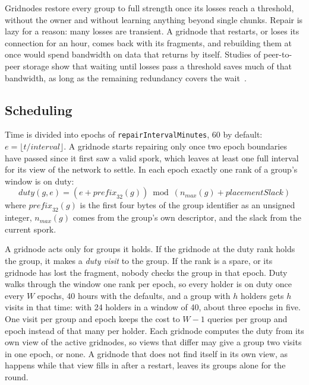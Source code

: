 \documentclass[10pt,a4paper,final]{article}
\newcommand{\code}[1]{\texttt{#1}}
\begin{document}
Gridnodes restore every group to full strength once its losses reach a threshold, without the owner and without
learning anything beyond single chunks. Repair is lazy for a reason: many losses are transient. A gridnode that
restarts, or loses its connection for an hour, comes back with its fragments, and rebuilding them at once would spend
bandwidth on data that returns by itself. Studies of peer-to-peer storage show that waiting until losses pass a
threshold saves much of that bandwidth, as long as the remaining redundancy covers the
wait~\cite{bhagwan2004,chun2006,giroire2010}.

\subsection{Scheduling}

Time is divided into epochs of \code{repairIntervalMinutes}, 60 by default: $e = \lfloor t / \mathit{interval}
\rfloor$. A gridnode starts repairing only once two epoch boundaries have passed since it first saw a valid spork,
which leaves at least one full interval for its view of the network to settle. In each epoch exactly one rank of a
group's window is on duty:
\begin{equation}
	\mathit{duty}(g, e) = \left(e + \mathit{prefix}_{32}(g)\right) \bmod \left(n_{max}(g) +
	\mathit{placementSlack}\right)
\end{equation}
where $\mathit{prefix}_{32}(g)$ is the first four bytes of the group identifier as an unsigned integer,
$n_{max}(g)$ comes from the group's own descriptor, and the slack from the current spork.

A gridnode acts only for groups it holds. If the gridnode at the duty rank holds the group, it makes a \emph{duty
visit} to the group. If the rank is a spare, or its gridnode has lost the fragment, nobody checks the group in that
epoch. Duty walks through the window one rank per epoch, so every holder is on duty once every $W$ epochs, 40 hours
with the defaults, and a group with $h$ holders gets $h$ visits in that time: with 24 holders in a window of 40,
about three epochs in five. One visit per group and epoch keeps the cost to $W - 1$ queries per group and epoch
instead of that many per holder. Each gridnode computes the duty from its own view of the active gridnodes, so
views that differ may give a group two visits in one epoch, or none. A gridnode that does not find itself in its
own view, as happens while that view fills in after a restart, leaves its groups alone for the round.
\end{document}
